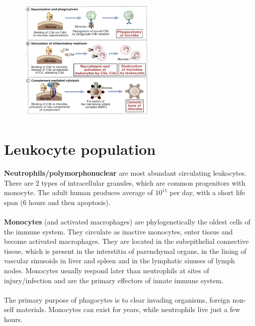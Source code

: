 \begin{figure}[ht]
\includegraphics[width=0.6\textwidth]{roles}
\caption{\label{fig:roles}}
\end{figure}

\section{Leukocyte population}

\textbf{Neutrophils/polymorphonuclear} are most abundant circulating leukocytes. 
There are 2 types of intracellular granules, which are common progenitors with monocyte. 
The adult human produces average of $10^11$ per day, with a short life span (6 hours and then apoptosis).
\\
\\
\noindent
\textbf{Monocytes} (and activated macrophages) are phylogenetically the oldest cells of the immune system. 
They circulate as inactive monocytes, enter tissue and become activated macrophages.
They are located in the subepithelial connective tissue, which is present in the interstitia of parenchymal organs, in the lining of vascular sinusoids in liver and spleen and in the lymphatic sinuses of lymph nodes.
Monocytes usually respond later than neutrophils at sites of injury/infection and are the primary effectors of innate immune system.
\\
\\
\noindent
The primary purpose of phagocytes is to clear invading organisms, foreign non-self materials. 
Monocytes can exist for years, while neutrophils live just a few hours.

